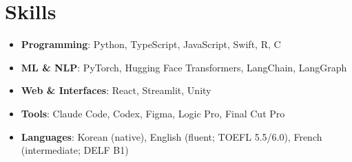 \documentclass[letterpaper,10pt]{article}
\let\oldsection\section
\renewcommand{\section}[1]{\needspace{8\baselineskip}\oldsection{#1}}
\newenvironment{plain}
  {\begin{itemize}[leftmargin=1.2em, itemsep=\PLAINSEP, parsep=0pt, topsep=\TOPSEP]}
  {\end{itemize}}
\begin{document}
\section{Skills}
\begin{plain}
  \item \textbf{Programming}: Python, TypeScript, JavaScript, Swift, R, C
  \item \textbf{ML \& NLP}: PyTorch, Hugging Face Transformers, LangChain, LangGraph
  \item \textbf{Web \& Interfaces}: React, Streamlit, Unity
  \item \textbf{Tools}: Claude Code, Codex, Figma, Logic Pro, Final Cut Pro
  \item \textbf{Languages}: Korean (native), English (fluent; TOEFL 5.5/6.0),
        French (intermediate; DELF B1)
\end{plain}
\end{document}
